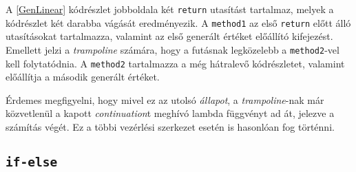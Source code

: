 A \ref{GenLinear} kódrészlet jobboldala két \texttt{return} utasítást tartalmaz, melyek a kódrészlet két darabba vágását eredményezik. A \texttt{method1} az első \texttt{return} előtt álló utasításokat tartalmazza, valamint az első generált értéket előállító kifejezést. Emellett jelzi a \textit{trampoline} számára, hogy a futásnak legközelebb a \texttt{method2}-vel kell folytatódnia. A \texttt{method2} tartalmazza a még hátralevő kódrészletet, valamint előállítja a második generált értéket. 

Érdemes megfigyelni, hogy mivel ez az utolsó \textit{állapot}, a \textit{trampoline}-nak már közvetlenül a kapott \textit{continuation}t meghívó lambda függvényt ad át, jelezve a számítás végét. Ez a többi vezérlési szerkezet esetén is hasonlóan fog történni.

\subsection{\texttt{if-else}}

